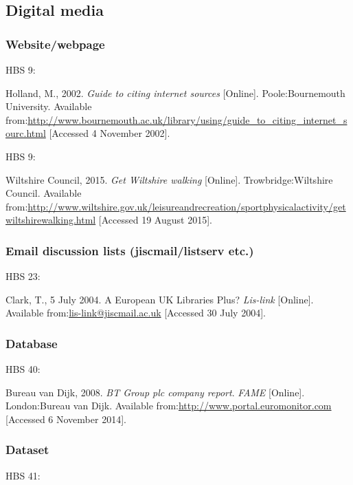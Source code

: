 \subsection{Digital media}

\subsubsection*{Website\slash webpage}

HBS 9: \cite{holland2002gci}

Holland, M., 2002. \emph{Guide to citing internet sources} [Online]. Poole:\@ Bournemouth University. Available from:\@ \url{http://www.bournemouth.ac.uk/library/using/guide_to_citing_internet_sourc.html} [Accessed 4 November 2002].


HBS 9: \cite{wiltshire2015gww}

Wiltshire Council, 2015. \emph{Get Wiltshire walking} [Online]. Trowbridge:\@ Wiltshire Council. Available from:\@ \url{http://www.wiltshire.gov.uk/leisureandrecreation/sportphysicalactivity/getwiltshirewalking.html} [Accessed 19 August 2015].



\subsubsection*{Email discussion lists (jiscmail\slash listserv etc.)}

HBS 23: \cite{clark2004euk}

Clark, T., 5 July 2004. A European UK Libraries Plus? \emph{Lis-link} [Online]. Available from:\@ \url{lis-link@jiscmail.ac.uk} [Accessed 30 July 2004].



\subsubsection*{Database}

HBS 40: \cite{bvd2008bt}

Bureau van Dijk, 2008. \emph{BT Group plc company report}. \emph{FAME} [Online]. London:\@ Bureau van Dijk. Available from:\@ \url{http://www.portal.euromonitor.com} [Accessed 6 November 2014].



\subsubsection*{Dataset}

HBS 41: \cite{wilson2013rgc}

